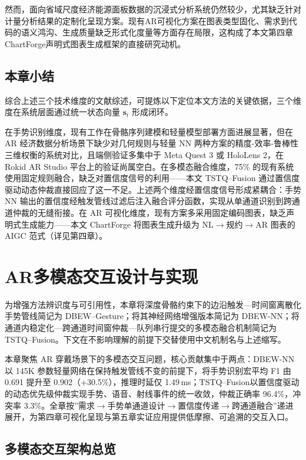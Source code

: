 然而，面向省域尺度经济能源面板数据的沉浸式分析系统仍然较少，尤其缺乏针对计量分析结果的定制化呈现方案。现有AR可视化方案在图表类型固化、需求到代码的语义鸿沟、生成质量缺乏形式化度量等方面存在局限，这构成了本文第四章ChartForge声明式图表生成框架的直接研究动机。

\section{本章小结}
\label{sec:ch2_summary}

综合上述三个技术维度的文献综述，可提炼以下定位本文方法的关键依据，三个维度在系统层面通过统一状态向量 $\mathbf{s}_t$ 形成闭环。

在手势识别维度，现有工作在骨骼序列建模和轻量模型部署方面进展显著，但在 AR 经济数据分析场景下缺少对几何规则与轻量 NN 两种方案的精度-效率-鲁棒性三维权衡的系统对比，且端侧验证多集中于 Meta Quest 3 或 HoloLens 2，在 Rokid AR Studio 平台上的验证尚属空白。在多模态融合维度，75\% 的现有系统使用固定规则融合\cite{bai2025ar_gesture_speech}，缺乏对置信度信号的利用——本文 TSTQ--Fusion 通过置信度驱动动态仲裁直接回应了这一不足。上述两个维度经置信度信号形成紧耦合：手势 NN 输出的置信度经触发管线过滤后注入融合评分函数，实现从单通道识别到跨通道仲裁的无缝衔接。在 AR 可视化维度，现有方案多采用固定编码图表，缺乏声明式生成能力——本文 ChartForge 将图表生成升级为 NL$\rightarrow$规约$\rightarrow$AR 图表的 AIGC 范式（详见第四章）。
\chapter{AR多模态交互设计与实现}
\label{ch:ar_interaction}

为增强方法辨识度与可引用性，本章将深度骨骼约束下的边沿触发—时间窗离散化手势管线简记为 DBEW--Gesture；将其神经网络增强版本简记为 DBEW-NN；将通道内稳定化—跨通道时间窗仲裁—队列串行提交的多模态融合机制简记为 TSTQ--Fusion。下文在不影响理解的前提下交替使用中文机制名与上述缩写。

本章聚焦 AR 穿戴场景下的多模态交互问题，核心贡献集中于两点：DBEW-NN以 145K 参数轻量网络在保持触发管线不变的前提下，将手势识别宏平均 F1 由 0.691 提升至 0.902（+30.5\%），推理时延仅 1.49\,ms；TSTQ--Fusion以置信度驱动的动态优先级仲裁实现手势、语音、射线事件的统一收敛，仲裁正确率 96.4\%，冲突率 3.3\%。全章按”需求$\rightarrow$手势单通道设计$\rightarrow$置信度传递$\rightarrow$跨通道融合”递进展开，为第四章可视化呈现与第五章实证应用提供低摩擦、可追溯的交互入口。

\section{多模态交互架构总览}
\label{sec:ch3_arch_overview}


